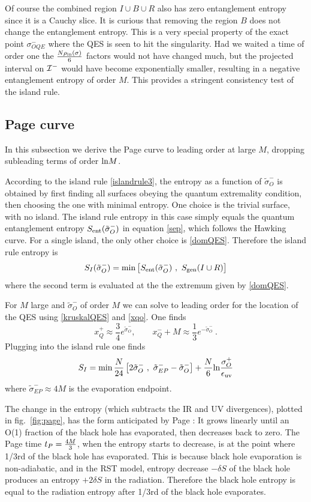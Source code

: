 \documentclass[12pt,oneside,letterpaper]{article}
\newcommand{\f}{\frac}
\newcommand{\be}{\begin{equation}}
\newcommand{\ee}{\end{equation}}
\def\be{\begin{eqnarray}}
\def\ee{\end{eqnarray}}
\let\s=\sigma \let\t=\tau \let\u=\upsilon \let\c=\chi
\let\f=\frac
\def\be{\begin{equation}}
\def\ee{\end{equation}}
\def\m{{M}}
\def\log{{\rm ln}}
\numberwithin{equation}{section}
\def \be {\begin{equation}}
\def \ee {\end{equation}}
\begin{document}
Of course the combined region $I\cup B\cup R$ also has zero entanglement entropy since it is a Cauchy slice. It is curious that removing the region $B$ does not change the entanglement entropy. This is a very special property of the exact point $\s^-_{OQE}$ where the QES is seen to hit the singularity. Had we waited a time of order one the $N\rho_{\text{in}}(\s) \over 6 $ factors would not have changed much, but the projected interval on ${\cal I}^-$ would have become exponentially smaller, resulting in a negative entanglement entropy of order $M$.  This provides a stringent consistency  test of the island rule. 


 


\subsection{Page curve}
In this subsection we derive the Page curve to leading order at large $\m$, dropping subleading terms of order $\log M$. 

According to the island rule \eqref{islandrule3}, the entropy as a function of $\tilde \s^-_O$ is obtained by first finding all surfaces obeying the quantum extremality condition, then choosing the one with minimal entropy. One choice is the trivial surface, with no island. The island rule entropy in this case simply equals the quantum entanglement entropy $S_{\rm ent}(\tilde \s^-_O   )$ in equation \eqref{sep}, which follows the Hawking curve.  For a single island, the only other choice is \eqref{domQES}. Therefore the island rule entropy is 
\be
S_I(\tilde \s^-_O) = \min\left[ S_{\rm ent}(\tilde \s^-_O   ) \ , \ S_{\rm gen}(I \cup R) \right]
\ee
where the second term is evaluated at the  the extremum given by \eqref{domQES}.


For $M$ large and $\tilde \sigma_O^-$ of order $M$ we can solve to leading order for the location of the QES using  \eqref{kruskalQES} and \eqref{xqo}. One finds 
\be\label{approxQ}
x^+_Q \approx \frac{3}{4} e^{ \tilde{\sigma}_O^- } , \qquad
x^-_Q +\m\approx \frac{1}{3}e^{- \tilde{\sigma}_O^-} \ .
\ee
Plugging into the island rule one finds
\be
S_I = \min\frac{N}{24}\left[ 2\tilde{\sigma}_O^- \ , \
\tilde{\sigma}^-_{EP} - \tilde{\sigma}_O^- \right]+{N \over 6}\log \f{\s^+_O}{\epsilon_{\text{uv}}}
\ee
where $\tilde{\sigma}^-_{EP}  \approx 4 \m $ is the evaporation endpoint. 

The change in the entropy (which subtracts the IR and UV divergences), plotted in fig.~\ref{fig:page}, has the form anticipated by Page \cite{Page:1993wv,Page:2013dx}: It grows linearly until an O(1) fraction of the black hole has evaporated, then decreases back to zero. 
The Page time $t_P={4\m \over 3}$, when the entropy starts to decrease, is at the point where 1/3rd of the black hole has evaporated. This is because black hole evaporation is non-adiabatic, and in the RST model,  entropy decrease $-\delta S$ of the black hole produces an entropy $+2\delta S$ in the radiation. Therefore the black hole entropy is equal to the radiation entropy after 1/3rd of the black hole evaporates.
\end{document}
